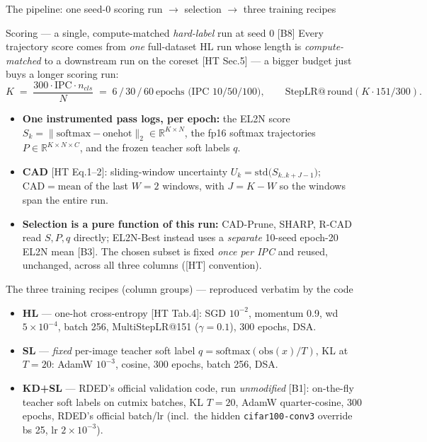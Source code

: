 \documentclass[aspectratio=169]{beamer}
\begin{document}
\begin{frame}{The pipeline: one seed-0 scoring run $\to$ selection $\to$ three training recipes}

    \begin{block}{Scoring --- a single, compute-matched \emph{hard-label} run at seed 0 [B8]}
    \tiny
    Every trajectory score comes from \emph{one} full-dataset HL run whose length is \emph{compute-matched}
    to a downstream run on the coreset [HT Sec.5] --- a bigger budget just buys a longer scoring run:
    \vspace{-0.12cm}
    $$K \;=\; \frac{300\cdot\mathrm{IPC}\cdot n_{cls}}{N} \;=\; 6\,/\,30\,/\,60\ \text{epochs (IPC 10/50/100)},
    \qquad \text{StepLR}@\,\mathrm{round}(K\cdot 151/300).$$
    \vspace{-0.4cm}
    \begin{itemize}\setlength\itemsep{1pt}
        \item \textbf{One instrumented pass logs, per epoch:} the EL2N score
              $S_k=\lVert\mathrm{softmax}-\mathrm{onehot}\rVert_2\in\mathbb{R}^{K\times N}$, the fp16 softmax
              trajectories $P\in\mathbb{R}^{K\times N\times C}$, and the frozen teacher soft labels $q$.
        \item \textbf{CAD} [HT Eq.1--2]: sliding-window uncertainty $U_k=\mathrm{std}\big(S_{k..k+J-1}\big)$;
              $\mathrm{CAD}=\mathrm{mean}$ of the last $W{=}2$ windows, with $J=K{-}W$ so the windows span the
              entire run.
        \item \textbf{Selection is a pure function of this run:} CAD-Prune, SHARP, R-CAD read $S,P,q$ directly;
              EL2N-Best instead uses a \emph{separate} 10-seed epoch-20 EL2N mean [B3]. The chosen subset is
              fixed \emph{once per IPC} and reused, unchanged, across all three columns ([HT] convention).
    \end{itemize}
    \end{block}

    \vspace{-0.1cm}
    \begin{block}{The three training recipes (column groups) --- reproduced verbatim by the code}
    \tiny
    \begin{itemize}\setlength\itemsep{1pt}
        \item \textbf{HL} --- one-hot cross-entropy [HT Tab.4]: SGD $10^{-2}$, momentum 0.9, wd $5{\times}10^{-4}$,
              batch 256, MultiStepLR@151 ($\gamma{=}0.1$), 300 epochs, DSA.
        \item \textbf{SL} --- \emph{fixed} per-image teacher soft label $q=\mathrm{softmax}(\mathrm{obs}(x)/T)$,
              KL at $T{=}20$: AdamW $10^{-3}$, cosine, 300 epochs, batch 256, DSA.
        \item \textbf{KD+SL} --- RDED's official validation code, run \emph{unmodified} [B1]: on-the-fly teacher
              soft labels on cutmix batches, KL $T{=}20$, AdamW quarter-cosine, 300 epochs, RDED's official
              batch/lr (incl.\ the hidden \texttt{cifar100-conv3} override bs 25, lr $2{\times}10^{-3}$).
    \end{itemize}
    \end{block}


\end{frame}
\end{document}
